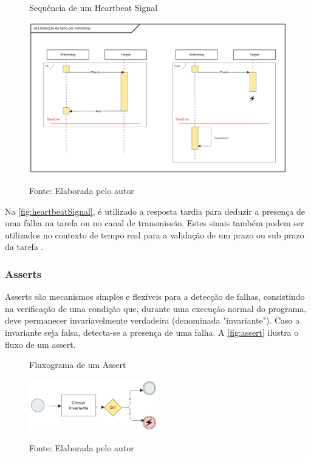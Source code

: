 \begin{figure}[H]
    \centering
    \captionsetup{justification=centering}
    \caption{Sequência de um Heartbeat Signal}
    \includegraphics[width=1.0\textwidth]{assets/heartbeat_signal.png}\\
    \captionsetup{justification=raggedright}
    \caption*{Fonte: Elaborada pelo autor}
    \label{fig:heartbeatSignal}
\end{figure}

Na \autoref{fig:heartbeatSignal}, é utilizado a resposta tardia para deduzir a presença de uma falha na tarefa ou no canal de transmissão. Estes sinais também podem ser utilizados no contexto de tempo real para a validação de um prazo ou sub prazo da tarefa \cite{FaultTolerantSystems}.

\subsubsection{Asserts}

Asserts são mecanismos simples e flexíveis para a detecção de falhas, consistindo na verificação de uma condição que, durante uma execução normal do programa, deve permanecer invariavelmente verdadeira (denominada "invariante"). Caso a invariante seja falsa, detecta-se a presença de uma falha. A \autoref{fig:assert} ilustra o fluxo de um assert.

\begin{figure}[H]
    \centering
    \captionsetup{justification=centering}
    \caption{Fluxograma de um Assert}
    \includegraphics[width=0.5\textwidth]{assets/assert_diagram.png}\\
    \captionsetup{justification=raggedright}
    \caption*{Fonte: Elaborada pelo autor}
    \label{fig:assert}
\end{figure}

